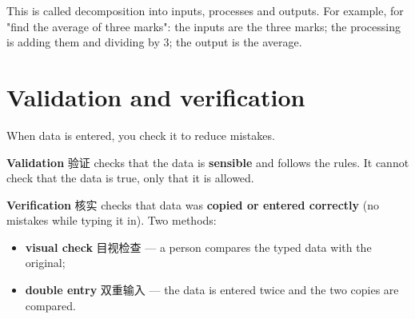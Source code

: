 \documentclass[11pt]{article}
\begin{document}
This is called decomposition into inputs, processes and outputs. For example, for "find the average of three marks": the inputs are the three marks; the processing is adding them and dividing by 3; the output is the average.

\section*{Validation and verification}

When data is entered, you check it to reduce mistakes.

\textbf{Validation} 验证 checks that the data is \textbf{sensible} and follows the rules. It cannot check that the data is true, only that it is allowed.

\begin{center}
\end{center}

\textbf{Verification} 核实 checks that data was \textbf{copied or entered correctly} (no mistakes while typing it in). Two methods:

\begin{itemize}
\item \textbf{visual check} 目视检查 — a person compares the typed data with the original;

\item \textbf{double entry} 双重输入 — the data is entered twice and the two copies are compared.

\end{itemize}
\end{document}

